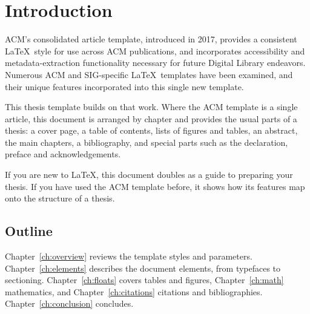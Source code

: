 \chapter{Introduction}
\label{ch:introduction}

ACM's consolidated article template, introduced in 2017, provides a
consistent \LaTeX\ style for use across ACM publications, and
incorporates accessibility and metadata-extraction functionality
necessary for future Digital Library endeavors. Numerous ACM and
SIG-specific \LaTeX\ templates have been examined, and their unique
features incorporated into this single new template.

This thesis template builds on that work. Where the ACM template is a
single article, this document is arranged by chapter and provides the
usual parts of a thesis: a cover page, a table of contents, lists of
figures and tables, an abstract, the main chapters, a bibliography, and
special parts such as the declaration, preface and acknowledgements.

If you are new to \LaTeX, this document doubles as a guide to preparing
your thesis. If you have used the ACM template before, it shows how its
features map onto the structure of a thesis.

\section{Outline}
\label{sec:outline}

Chapter~\ref{ch:overview} reviews the template styles and parameters.
Chapter~\ref{ch:elements} describes the document elements, from
typefaces to sectioning. Chapter~\ref{ch:floats} covers tables and
figures, Chapter~\ref{ch:math} mathematics, and Chapter~\ref{ch:citations}
citations and bibliographies. Chapter~\ref{ch:conclusion} concludes.
